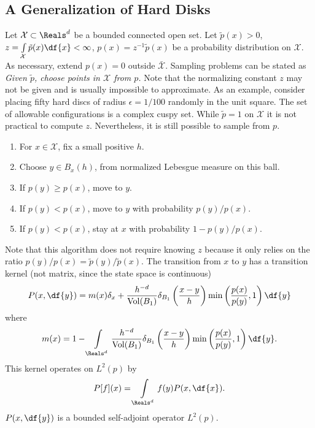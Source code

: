 \documentclass[12pt]{article}
\begin{document}
\subsection*{A Generalization of Hard Disks}

Let \( \mathcal{X} \subset \Reals^d \) be a bounded connected open set.
Let \( \tilde{p}(x) > 0 \), \( z = \int\limits_{\mathcal{X}} \tilde{p}(x)
\df{x} < \infty \), \( p(x) = z^{-1} \tilde{p}(x) \) be a probability
distribution on \( \mathcal{X} \).  As necessary, extend \( p(x) = 0 \)
outside \( \bar{\mathcal{X}} \).  Sampling problems can be stated as
\emph{Given \( \tilde{p} \), choose points in \( \mathcal{X} \) from \(
p \).} Note that the normalizing constant \( z \) may not be given and
is usually impossible to approximate.  As an example, consider placing
fifty hard discs of radius \( \epsilon = 1/100 \) randomly in the unit
square.  The set of allowable configurations is a complex cuspy set.
While \( \tilde{p} = 1 \) on \( \mathcal{X} \) it is not practical to
compute \( z \).  Nevertheless, it is still possible to sample from \( p
\).
\begin{enumerate}
    \item
        For \( x \in \mathcal{X} \), fix a small positive \( h \).
    \item
        Choose \( y \in B_x(h) \), from normalized Lebesgue measure on
        this ball.
    \item
        If \( p(y) \ge p(x) \), move to \( y \).
    \item
        If \( p(y) < p(x) \), move to \( y \) with probability \( p(y)/p
        (x) \).
    \item
        If \( p(y) < p(x) \), stay at \( x \) with probability \( 1 - p(y)/p
        (x) \).
\end{enumerate}
Note that this algorithm does not require knowing \( z \) because it
only relies on the ratio \( p(y)/p(x) = \tilde{p}(y)/\tilde{p}(x) \).
The transition from \( x \) to \( y \) has a transition kernel (not
matrix, since the state space is continuous)
\[
    P(x, \df{y}) = m(x)\delta_x + \frac{h^{-d}}{%
    \operatorname{Vol}
    (B_1)} \delta_{B_1}\left( \frac{x-y}{h} \right) \min \left( \frac{p(x)}
    {p(y)}, 1 \right) \df{y}
\] where
\[
    m(x) = 1 - \int\limits_{\Reals^d} \frac{h^{-d}}{%
    \operatorname{Vol}
    (B_1)} \delta_{B_1}\left( \frac{x-y}{h} \right) \min \left( \frac{p(x)}
    {p(y)}, 1 \right) \df{y}.
\] This kernel operates on \( L^2(p) \) by
\[
    P[f](x) = \int\limits_{\Reals^d} f(y) P(x,\df{x}).
\] \( P(x,\df{y}) \) is a bounded self-adjoint operator \( L^2(p) \).
\end{document}
